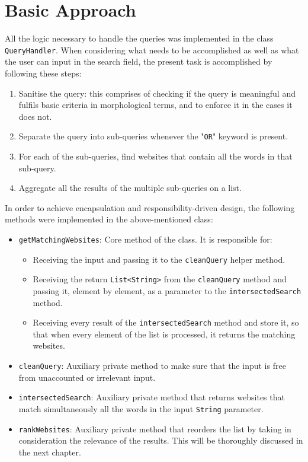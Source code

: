 \section{Basic Approach} %
All the logic necessary to handle the queries was implemented in the class {\tt QueryHandler}.
When considering what needs to be accomplished as well as what the user can input in the search field, the present task is accomplished by following these steps:
\begin{enumerate}
    \item Sanitise the query: this comprises of checking if the query is meaningful and fulfils basic criteria in morphological terms, and to enforce it in the cases it does not.
    \item Separate the query into sub-queries whenever the "{\tt OR}" keyword is present.
    \item For each of the sub-queries, find websites that contain all the words in that sub-query.
    \item Aggregate all the results of the multiple sub-queries on a list.
\end{enumerate}
In order to achieve encapsulation and responsibility-driven design, the following methods were implemented in the above-mentioned class:
\begin{itemize}
    \item {\tt getMatchingWebsites}: Core method of the class. It is responsible for:
    \begin{itemize}
        \item Receiving the input and passing it to the {\tt cleanQuery} helper method.
        \item Receiving the return {\tt List<String>} from the {\tt cleanQuery} method and passing it, element by element, as a parameter to the {\tt intersectedSearch} method.
        \item Receiving every result of the {\tt intersectedSearch} method and store it, so that when every element of the list is processed, it returns the matching websites.
    \end{itemize}
    \item {\tt cleanQuery}: Auxiliary private method to make sure that the input is free from unaccounted or irrelevant input.
    \item {\tt intersectedSearch}: Auxiliary private method that returns websites that match simultaneously all the words in the input {\tt String} parameter.
    \item {\tt rankWebsites}: Auxiliary private method that reorders the list by taking in consideration the relevance of the results. This will be thoroughly discussed in the next chapter.
\end{itemize}

